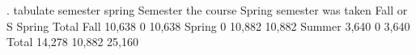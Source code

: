 . tabulate semester spring
{\smallskip}
  Semester {\VBAR}
the course {\VBAR}    Spring semester
 was taken {\VBAR} Fall or S     Spring {\VBAR}     Total
      Fall {\VBAR}    10,638          0 {\VBAR}    10,638 
    Spring {\VBAR}         0     10,882 {\VBAR}    10,882 
    Summer {\VBAR}     3,640          0 {\VBAR}     3,640 
     Total {\VBAR}    14,278     10,882 {\VBAR}    25,160 
{\smallskip}
